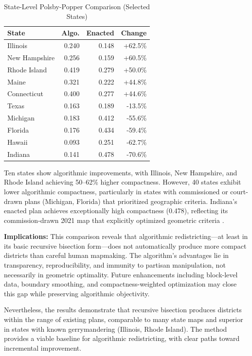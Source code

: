 \begin{table}[h]
\centering
\caption{State-Level Polsby-Popper Comparison (Selected States)}
\label{tab:state_comparison}
\small
\begin{tabular}{lrrr}
\toprule
\textbf{State} & \textbf{Algo.} & \textbf{Enacted} & \textbf{Change} \\
\midrule
Illinois & 0.240 & 0.148 & +62.5\% \\
New Hampshire & 0.256 & 0.159 & +60.5\% \\
Rhode Island & 0.419 & 0.279 & +50.0\% \\
Maine & 0.321 & 0.222 & +44.8\% \\
Connecticut & 0.400 & 0.277 & +44.6\% \\
\midrule
Texas & 0.163 & 0.189 & -13.5\% \\
Michigan & 0.183 & 0.412 & -55.6\% \\
Florida & 0.176 & 0.434 & -59.4\% \\
Hawaii & 0.093 & 0.251 & -62.7\% \\
Indiana & 0.141 & 0.478 & -70.6\% \\
\bottomrule
\end{tabular}
\end{table}

Ten states show algorithmic improvements, with Illinois, New Hampshire, and Rhode Island achieving 50--62\% higher compactness. However, 40 states exhibit lower algorithmic compactness, particularly in states with commissioned or court-drawn plans (Michigan, Florida) that prioritized geographic criteria. Indiana's enacted plan achieves exceptionally high compactness (0.478), reflecting its commission-drawn 2021 map that explicitly optimized geometric criteria \cite{indiana2021redistricting}.

\textbf{Implications:} This comparison reveals that algorithmic redistricting—at least in its basic recursive bisection form—does not automatically produce more compact districts than careful human mapmaking. The algorithm's advantages lie in transparency, reproducibility, and immunity to partisan manipulation, not necessarily in geometric optimality. Future enhancements including block-level data, boundary smoothing, and compactness-weighted optimization may close this gap while preserving algorithmic objectivity.

Nevertheless, the results demonstrate that recursive bisection produces districts within the range of existing plans, comparable to many state maps and superior in states with known gerrymandering (Illinois, Rhode Island). The method provides a viable baseline for algorithmic redistricting, with clear paths toward incremental improvement.

